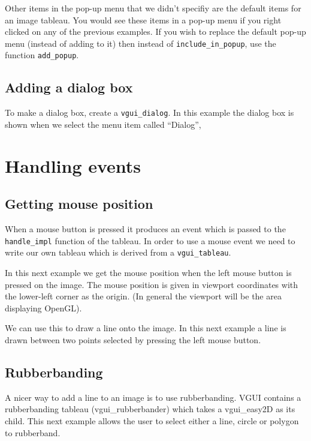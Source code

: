 \documentclass[12pt]{report}
\newcommand{\FSMinput}[1]{}
\begin{document}
Other items in the pop-up menu that we didn't specifiy are the default items for an 
image tableau.  You would see these items in a pop-up menu if you right clicked on any
of the previous examples.  If you wish to replace the default pop-up menu (instead of 
adding to it) then instead of {\tt include\_in\_popup}, use the function {\tt add\_popup}.

\section{Adding a dialog box}

To make a dialog box, create a {\tt vgui\_dialog}.  In this example the dialog box is
shown when we select the menu item called ``Dialog'',

\FSMinput{dialog-example}

\chapter{Handling events}

\section{Getting mouse position}

When a mouse button is pressed it produces an event which is passed to the 
{\tt handle\_impl} function of the tableau.  In order to use a mouse event we need to write 
our own tableau which is derived from a {\tt vgui\_tableau}.  

In this next example we get the mouse position when the left mouse button is pressed on
the image.  The mouse position is given in viewport coordinates with the lower-left corner 
as the origin. (In general the viewport will be the area displaying OpenGL).

\FSMinput{mouse-position}

We can use this to draw a line onto the image.  In this next example a line is drawn between
two points selected by pressing the left mouse button.
\FSMinput{mouse-draw-line}

\section{Rubberbanding}

A nicer way to add a line to an image is to use rubberbanding.  VGUI contains a 
rubberbanding tableau (vgui\_rubberbander) which takes a vgui\_easy2D as its child.  This
next example allows the user to select either a line, circle or polygon to rubberband.
\FSMinput{rubberband} 
\end{document}
